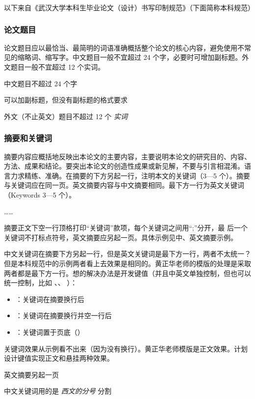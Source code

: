 以下来自《武汉大学本科生毕业论文（设计）书写印制规范》（下面简称本科规范）


\subsubsection{论文题目}

\begin{reference}
  论文题目应以最恰当、最简明的词语准确概括整个论文的核心内容，避免使用不常见的缩略词、缩写字。中文题目一般不宜超过 24 个字，必要时可增加副标题。外文题目一般不宜超过 12 个实词。
\end{reference}

\begin{points}
  \item 中文题目不超过 24 个字
  \item 可以加副标题，但没有副标题的格式要求
  \item 外文（不止英文）题目不超过 12 个 \emph{实词}
\end{points}


\subsubsection{摘要和关键词}

\begin{reference}
  摘要内容应概括地反映出本论文的主要内容，主要说明本论文的研究目的、内容、方法、成果和结论。要突出本论文的创造性成果或新见解，不要与引言相混淆。语言力求精练、准确。在摘要的下方另起一行，注明本文的关键词（3—5 个）。摘要与关键词应在同一页。英文摘要内容与中文摘要相同。最下方一行为英文关键词（Keywords 3—5 个）。

  ……

  摘要正文下空一行顶格打印“关键词”款项，每个关键词之间用“;”分开，最 后一个关键词不打标点符号，英文摘要应另起一页。具体示例见中、英文摘要示例。
\end{reference}

\begin{points}
  \item 中文关键词在摘要下方另起一行，但是英文关键词是最下方一行，两者不太统一？但是本科规范中的示例两者看上去效果是相同的。黄正华老师的模版的处理是采取两者都是最下方一行。想的解决办法是开发键值（并且中英文单独控制，但也可以统一控制，比如 、、 ）：
    \begin{itemize}
      \item {}：关键词在摘要换行后
      \item {}：关键词在摘要换行并空一行后
      \item {}：关键词置于页底（）
    \end{itemize}
  \item 关键词效果从示例看不出来（因为没有换行）。黄正华老师模版是正文效果。计划设计键值实现正文和悬挂两种效果。
  \item 英文摘要另起一页
  \item 中文关键词用的是 \emph{西文的分号} 分割
\end{points}


